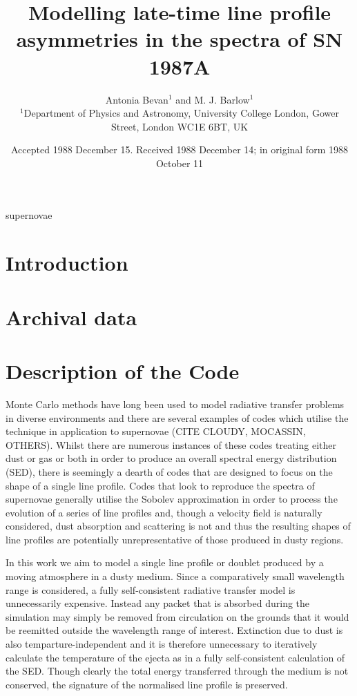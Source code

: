 \documentclass[useAMS,usenatbib]{mn2e}
\title[Modelling late-time line profile asymmetries in the spectra of SN 1987A]{Modelling late-time line profile asymmetries in the spectra of SN 1987A}
\author[Antonia Bevan and M. J. Barlow]{Antonia Bevan$^{1}$ and M. J. Barlow$^{1}$\\
$^{1}$Department of Physics and Astronomy, University College London, Gower Street, London WC1E 6BT, UK}
\begin{document}
\date{Accepted 1988 December 15. Received 1988 December 14; in original form 1988 October 11}

\pagerange{\pageref{firstpage}--\pageref{lastpage}} 

\maketitle

\label{firstpage}

\begin{abstract}

\end{abstract}

\begin{keywords}
supernovae
\end{keywords}

\section{Introduction}


\section{Archival data}

\section{Description of the Code}

Monte Carlo methods have long been used to model radiative transfer problems in diverse environments and there are several examples of codes which utilise the technique in application to supernovae (CITE CLOUDY, MOCASSIN, OTHERS).  Whilst there are numerous instances of these codes treating either dust or gas or both in order to produce an overall spectral energy distribution (SED), there is seemingly a dearth of codes that are designed to focus on the shape of a single line profile.  Codes that look to reproduce the spectra of supernovae generally utilise the Sobolev approximation in order to process the evolution of a series of line profiles and, though a velocity field is naturally considered, dust absorption and scattering is not and thus the resulting shapes of line profiles are potentially unrepresentative of those produced in dusty regions.

In this work we aim to model a single line profile or doublet produced by a moving atmosphere in a dusty medium.  Since a comparatively small wavelength range is considered, a fully self-consistent radiative transfer model is unnecessarily expensive.  Instead any packet that is absorbed during the simulation may simply be removed from circulation on the grounds that it would be reemitted outside the wavelength range of interest.   Extinction due to dust is also temparture-independent and it is therefore unnecessary to iteratively calculate the temperature of the ejecta as in a fully self-consistent calculation of the SED.  Though clearly the total energy transferred through the medium is not conserved, the signature of the normalised line profile is preserved.
\end{document}
